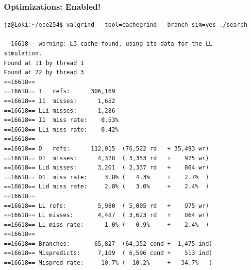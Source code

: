 \begin{frame}[fragile]
\frametitle{Optimizations: Enabled!}
{\scriptsize
\begin{verbatim}
jz@Loki:~/ece254$ valgrind --tool=cachegrind --branch-sim=yes ./search

--16618-- warning: L3 cache found, using its data for the LL simulation.
Found at 11 by thread 1 
Found at 22 by thread 3 
==16618== 
==16618== I   refs:      306,169
==16618== I1  misses:      1,652
==16618== LLi misses:      1,286
==16618== I1  miss rate:    0.53%
==16618== LLi miss rate:    0.42%
==16618== 
==16618== D   refs:      112,015  (76,522 rd   + 35,493 wr)
==16618== D1  misses:      4,328  ( 3,353 rd   +    975 wr)
==16618== LLd misses:      3,201  ( 2,337 rd   +    864 wr)
==16618== D1  miss rate:     3.8% (   4.3%     +    2.7%  )
==16618== LLd miss rate:     2.8% (   3.0%     +    2.4%  )
==16618== 
==16618== LL refs:         5,980  ( 5,005 rd   +    975 wr)
==16618== LL misses:       4,487  ( 3,623 rd   +    864 wr)
==16618== LL miss rate:      1.0% (   0.9%     +    2.4%  )
==16618== 
==16618== Branches:       65,827  (64,352 cond +  1,475 ind)
==16618== Mispredicts:     7,109  ( 6,596 cond +    513 ind)
==16618== Mispred rate:     10.7% (  10.2%     +   34.7%   )
\end{verbatim}
}

\end{frame}

